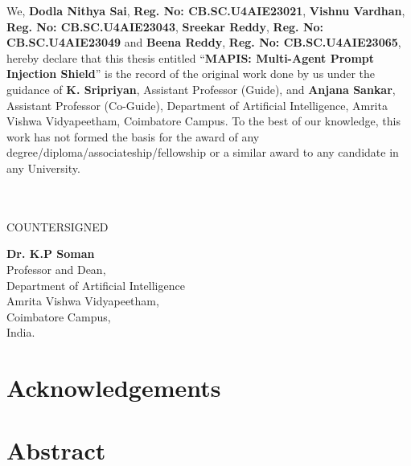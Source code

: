 \documentclass[a4paper, 12pt]{report}
\theoremstyle{definition}
\begin{document}
	\noindent We, \textbf{Dodla Nithya Sai}, \textbf{Reg. No: CB.SC.U4AIE23021}, \textbf{Vishnu Vardhan}, \textbf{Reg. No: CB.SC.U4AIE23043}, \textbf{Sreekar Reddy}, \textbf{Reg. No: CB.SC.U4AIE23049} and \textbf{Beena Reddy}, \textbf{Reg. No: CB.SC.U4AIE23065}, hereby declare that this thesis entitled \enquote{\textbf{MAPIS: Multi-Agent Prompt Injection Shield}} is the record of the original work done by us under the guidance of \textbf{K. Sripriyan}, Assistant Professor (Guide), and \textbf{Anjana Sankar}, Assistant Professor (Co-Guide), Department of Artificial Intelligence, Amrita Vishwa Vidyapeetham, Coimbatore Campus. To the best of our knowledge, this work has not formed the basis for the award of any degree/diploma/associateship/fellowship or a similar award to any candidate in any University.\\\\
	
	\vspace*{1cm}
	 \\
	\vfill
	\begin{center}
		\large{COUNTERSIGNED}\\
	\end{center}
	\vspace{0.6in}
	
\begin{center}
		\textbf{Dr. K.P Soman}\\
	Professor and Dean, \\ 
	Department of Artificial Intelligence \\ Amrita Vishwa Vidyapeetham,\\
	Coimbatore Campus,\\
	India.
\end{center}
	
	\clearpage
	\tableofcontents
	
	\chapter*{Acknowledgements}

\listoffigures
	\listoftables
	\newpage

\chapter*{Abstract}

\end{document}
